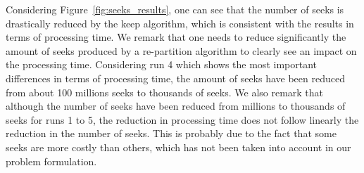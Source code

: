 \documentclass[sigconf, nonacm]{acmart}
\begin{document}
{Considering Figure~\ref{fig:seeks_results}, one can see that the number of
seeks is drastically reduced by the keep algorithm, which is consistent with
the results in terms of processing time.
We remark that one needs to reduce significantly the amount of seeks produced
by a re-partition algorithm to clearly see an impact on the processing time.
Considering run 4 which shows the most important differences in terms of
processing time, the amount of seeks have been reduced from about 100 millions
seeks to thousands of seeks.
We also remark that although the number of seeks have been reduced from millions
to thousands of seeks for runs 1 to 5, the reduction in processing time does not
follow linearly the reduction in the number of seeks.
This is probably due to the fact that some seeks are more costly than others,
which has not been taken into account in our problem formulation.

}
\end{document}

